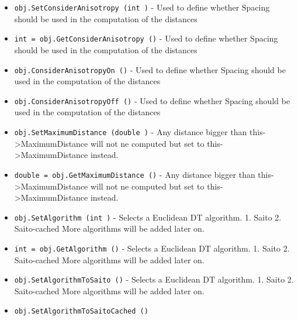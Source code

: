 \begin{itemize}
\item  \verb|obj.SetConsiderAnisotropy (int )| -  Used to define whether Spacing should be used in the computation of the
 distances 

\item  \verb|int = obj.GetConsiderAnisotropy ()| -  Used to define whether Spacing should be used in the computation of the
 distances 

\item  \verb|obj.ConsiderAnisotropyOn ()| -  Used to define whether Spacing should be used in the computation of the
 distances 

\item  \verb|obj.ConsiderAnisotropyOff ()| -  Used to define whether Spacing should be used in the computation of the
 distances 

\item  \verb|obj.SetMaximumDistance (double )| -  Any distance bigger than this->MaximumDistance will not ne computed but
 set to this->MaximumDistance instead. 

\item  \verb|double = obj.GetMaximumDistance ()| -  Any distance bigger than this->MaximumDistance will not ne computed but
 set to this->MaximumDistance instead. 

\item  \verb|obj.SetAlgorithm (int )| -  Selects a Euclidean DT algorithm. 
 1. Saito
 2. Saito-cached 
 More algorithms will be added later on. 

\item  \verb|int = obj.GetAlgorithm ()| -  Selects a Euclidean DT algorithm. 
 1. Saito
 2. Saito-cached 
 More algorithms will be added later on. 

\item  \verb|obj.SetAlgorithmToSaito ()| -  Selects a Euclidean DT algorithm. 
 1. Saito
 2. Saito-cached 
 More algorithms will be added later on. 

\item  \verb|obj.SetAlgorithmToSaitoCached ()|

\end{itemize}
